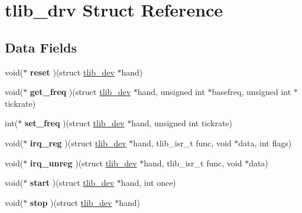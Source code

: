 \hypertarget{structtlib__drv}{}\section{tlib\+\_\+drv Struct Reference}
\label{structtlib__drv}
\subsection*{Data Fields}
\begin{DoxyCompactItemize}
\item 
\mbox{\label{structtlib__drv_a9b7474125381c96c081680fe8786722d}} 
void($\ast$ {\bfseries reset} )(struct \mbox{\hyperlink{structtlib__dev}{tlib\+\_\+dev}} $\ast$hand)
\item 
\mbox{\label{structtlib__drv_aa23f2c5b731c7a86142efe51e858cfd9}} 
void($\ast$ {\bfseries get\+\_\+freq} )(struct \mbox{\hyperlink{structtlib__dev}{tlib\+\_\+dev}} $\ast$hand, unsigned int $\ast$basefreq, unsigned int $\ast$tickrate)
\item 
\mbox{\label{structtlib__drv_a3a0090e3af681c5388b0fbd48656abb2}} 
int($\ast$ {\bfseries set\+\_\+freq} )(struct \mbox{\hyperlink{structtlib__dev}{tlib\+\_\+dev}} $\ast$hand, unsigned int tickrate)
\item 
\mbox{\label{structtlib__drv_ad1fdf23a9f580733097c740060f77e5b}} 
void($\ast$ {\bfseries irq\+\_\+reg} )(struct \mbox{\hyperlink{structtlib__dev}{tlib\+\_\+dev}} $\ast$hand, tlib\+\_\+isr\+\_\+t func, void $\ast$data, int flags)
\item 
\mbox{\label{structtlib__drv_aed18c498f6ee33ea77acfeac8861f55a}} 
void($\ast$ {\bfseries irq\+\_\+unreg} )(struct \mbox{\hyperlink{structtlib__dev}{tlib\+\_\+dev}} $\ast$hand, tlib\+\_\+isr\+\_\+t func, void $\ast$data)
\item 
\mbox{\label{structtlib__drv_a6cb7e28e6ce54e36ea9ba944568ca299}} 
void($\ast$ {\bfseries start} )(struct \mbox{\hyperlink{structtlib__dev}{tlib\+\_\+dev}} $\ast$hand, int once)
\item 
\mbox{\label{structtlib__drv_ae42e0078ab2a45f0324fb1fa1dc425e1}} 
void($\ast$ {\bfseries stop} )(struct \mbox{\hyperlink{structtlib__dev}{tlib\+\_\+dev}} $\ast$hand)

\end{DoxyCompactItemize}
